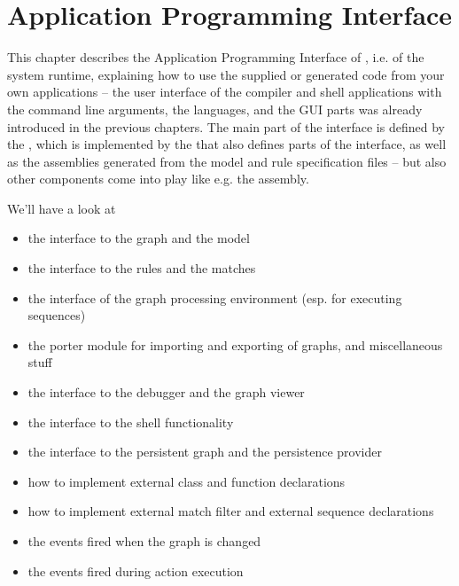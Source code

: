 \chapter{Application Programming Interface} 
\label{cha:api}


This chapter describes the Application Programming Interface of \GrG, i.e. of the system runtime, explaining how to use the supplied or generated code from your own applications -- the user interface of the compiler and shell applications with the command line arguments, the languages, and the GUI parts was already introduced in the previous chapters.
The main part of the interface is defined by the \LibGr{}, which is implemented by the \LGSPBackend{} that also defines parts of the interface, as well as the assemblies generated from the model and rule specification files -- but also other components come into play like e.g. the \GraphViewerAndSequenceDebugger{} assembly.

We'll have a look at
\begin{itemize}
\item the interface to the graph and the model
\item the interface to the rules and the matches
\item the interface of the graph processing environment (esp. for executing sequences)
\item the porter module for importing and exporting of graphs, and miscellaneous stuff
\item the interface to the debugger and the graph viewer
\item the interface to the shell functionality
\item the interface to the persistent graph and the persistence provider
\item how to implement external class and function declarations
\item how to implement external match filter and external sequence declarations
\item the events fired when the graph is changed
\item the events fired during action execution
\end{itemize}

